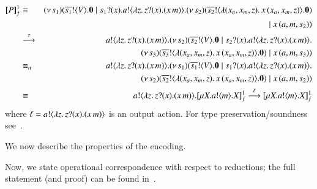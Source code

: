 \documentclass[runningheads]{llncs}
\begin{document}
{\begin{example}
\begin{eqnarray*}
\pmapp{P}{1}{f} & \scong & \newsp{s_1}{\bout{\dual{s_1}}{V} \inact \Par \binp{s_1}{x} \bout{a}{\abs{z}{\binp{z}{x} (\appl{x}{m})}} \newsp{s_2}{\bout{\dual{s_2}}{\abs{(x_a, x_m, z)}{\appl{x}{(x_a, x_m, z)}}} \inact}  \\
& & \qquad \Par \appl{x}{(a,m, s_2)}} \\
& \by{\tau} & \bout{a}{\abs{z}{\binp{z}{x} (\appl{x}{m})}} \newsp{s_2}{\bout{\dual{s_2}}{V} \inact \Par \binp{s_2}{x} \bout{a}{\abs{z}{\binp{z}{x} (\appl{x}{m})}} \\
& & \qquad \qquad \quad \qquad \qquad \qquad \newsp{s_3}{\bout{\dual{s_3}}{\abs{(x_a, x_m, z)}{\appl{x}{(x_a, x_m, z)}}} \inact} \Par \appl{x}{(a,m, s_3)}} \\
& \scong_{\alpha} & \bout{a}{\abs{z}{\binp{z}{x} (\appl{x}{m})}} \newsp{s_1}{\bout{\dual{s_1}}{V} \inact \Par \binp{s_1}{x} \bout{a}{\abs{z}{\binp{z}{x} (\appl{x}{m})}} \\
& & \qquad \qquad \qquad \qquad \quad \qquad \newsp{s_2}{\bout{\dual{s_2}}{\abs{(x_a, x_m, z)}{\appl{x}{(x_a, x_m, z)}}} \inact} \Par \appl{x}{(a,m, s_2)}} \\
& \scong & 
		\bout{a}{\abs{z}{\binp{z}{x} (\appl{x}{m})}} \pmapp{\recp{X}{\bout{a}{m} \varp{X}}}{1}{f} \by{\ell} 
		\pmapp{\recp{X}{\bout{a}{m} \varp{X}}}{1}{f}
\end{eqnarray*}
where $\ell = a ! \langle \lambda z.\,z ? (x) . (x\, {m}) \rangle$ is an output action.
For type preservation/soundness see~\cite{KouzapasPY15}.
\end{example}


We now describe the properties of the encoding. 

Now, we state operational correspondence with respect to reductions; 
the full statement (and proof) can be found in~\cite{KouzapasPY15}.

}
\end{document}
